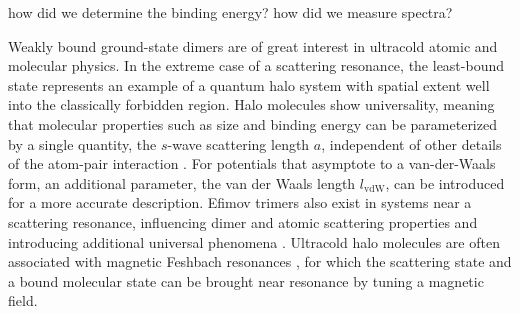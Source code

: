how did we determine the binding energy? how did we measure spectra?

Weakly bound ground-state dimers are of great interest in ultracold atomic and molecular physics. In the extreme case of a scattering resonance, the least-bound state represents an example of a quantum halo system \cite{jrf04} with spatial extent well into the classically forbidden region. Halo molecules show universality, meaning that molecular properties such as size and binding energy can be parameterized by a single quantity, the $s$-wave scattering length $a$, independent of other details of the atom-pair interaction \cite{kgj06,bha06}. For potentials that asymptote to a van-der-Waals form, an additional parameter, the van der Waals length $l_{\mathrm{vdW}}$, can be introduced for a more accurate description. Efimov trimers also exist in systems near a scattering resonance, influencing dimer and atomic scattering properties and introducing additional universal phenomena \cite{bha07,nen17}. Ultracold halo molecules are often associated with magnetic Feshbach resonances \cite{cgj10}, for which the scattering state and a bound molecular state can be brought near resonance by tuning a magnetic field.




